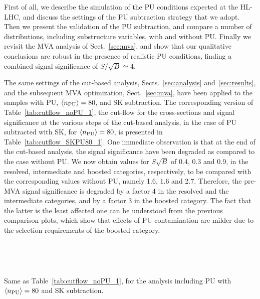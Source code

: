 First of all, we describe the simulation of the 
PU conditions  expected at the HL-LHC, and discuss the settings of
the PU subtraction strategy that we adopt.
%
Then we present the validation of the PU subtraction,
and compare a number of distributions, including substructure variables,
with and without PU.
%
Finally we revisit the MVA analysis of Sect.~\ref{sec:mva}, and
show that our qualitative conclusions are robust
in the presence of realistic PU conditions, finding
a combined
signal significance of $S/\sqrt{B}\simeq 4$.

The same settings of the cut-based analysis,
Sects.~\ref{sec:analysis} and~\ref{sec:results}, and
the subsequent MVA optimization, Sect.~\ref{sec:mva}, have
been applied to the samples with PU, $\left\langle n_{\rm PU}\right\rangle=80$,
and SK subtraction.
%
The corresponding version of Table~\ref{tab:cutflow_noPU_1}, the 
cut-flow for the cross-sections and signal significance at the various
steps of the cut-based analysis, 
in the case
of PU subtracted with SK, for $\left\langle n_{\rm PU}\right\rangle=80$,
is presented in Table~\ref{tab:cutflow_SKPU80_1}.
%
One immediate observation is that
at the end of the cut-based analysis,
the signal significance have been  degraded
as compared to the case without PU.
%
We now obtain values for $S\sqrt{B}$ of 0.4, 0.3 and 0.9, in the resolved,
intermediate and boosted categories, respectively, to be compared
with the corresponding values without PU, namely 1.6, 1.6 and 2.7.
%
Therefore, the pre-MVA signal significance is degraded by a factor 4 in
the resolved and the intermediate categories,
and by a factor 3 in the boosted category.
%
The fact that the latter is the  least affected one
can be understood from the previous comparison
plots, which show that effects of PU contamination
are milder due to the  selection requirements
of the boosted category.

\begin{table}[t]
  \centering
  \scriptsize
  
  $\,$ \\
  \vspace{0.5cm}
  
  $\,$ \\
  \vspace{0.5cm}
    
    \caption{\small
      Same as Table~\ref{tab:cutflow_noPU_1}, for the analysis
      including PU with $\left\langle n_{\rm PU}\right\rangle=80$ and SK subtraction.
      \label{tab:cutflow_SKPU80_1}}
\end{table}


